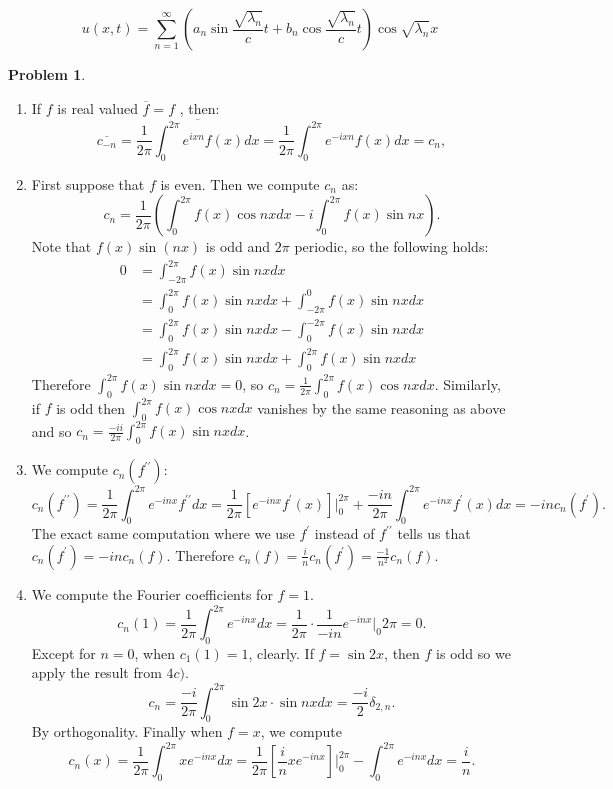\documentclass[12pt, a4paper]{article}
\newtheorem{problem}{Problem}
\theoremstyle{definition}
\newcommand{\penum}{ \begin{enumerate}[label=\bf(\alph*), leftmargin=0pt]}
\newcommand{\epenum}{ \end{enumerate} }
\newcommand{\ol}{\overline}
\begin{document}
$$u(x,t) = \sum_{n=1}^\infty \left( a_n \sin \frac{\sqrt{\lambda_n}}{c}t + b_n \cos \frac{\sqrt{\lambda_n}}{c} t\right)\cos \sqrt{\lambda_n} x$$
 \newpage 
\begin{problem}
\end{problem}
\penum
\item If $f$ is real valued $\ol{f} = f$ , then: 
$$\ol{c_{-n}} = \ol{\frac{1}{2\pi} \int_0^{2\pi} e^{ixn}f(x)dx } = \frac{1}{2\pi} \int_0^{2\pi} e^{-ixn}f(x)dx = c_n,$$
\item 
First suppose that $f$ is even. Then we compute $c_n$ as: 
$$c_n = \frac{1}{2\pi}\left( \int_0^{2\pi} f(x)\cos nx dx - i\int_0^{2\pi} f(x)\sin nx  \right).$$
Note that $f(x)\sin(nx)$ is odd and $2\pi$ periodic, so the following holds: 
\begin{align*} 0& = \int_{-2\pi}^{2\pi}f(x)\sin nx dx
	\\ & = \int_0^{2\pi}f(x)\sin nx dx + \int_{-2\pi }^0 f(x)\sin nx dx 
	\\ & = \int_0^{2\pi}f(x)\sin nx dx - \int_{0}^{-2\pi} f(x)\sin nx dx 
	\\ & = \int_0^{2\pi}f(x)\sin nx dx + \int_{0}^{2\pi} f(x)\sin nx dx \tag{changing variables, f even,}
\end{align*}
Therefore $\int_{0}^{2\pi} f(x)\sin nx dx =0 $, so $c_n =\frac{1}{2\pi }\int_0^{2\pi} f(x)\cos nx dx$. 
Similarly, if $f$ is odd then $\int_0^{2\pi} f(x) \cos nx dx$ vanishes by the same reasoning as above and so $c_n = \frac{-ii}{2\pi} \int_{0}^{2\pi} f(x) \sin nx dx$. 
\item We compute $c_n(f^{\prime \prime})$: 
$$c_n(f^{\prime \prime}) = \frac{1}{2\pi} \int_0^{2\pi} e^{-inx}f^{\prime \prime} dx  = \frac{1}{2\pi} \left[e^{-inx}f^\prime(x) \right] \Big|_{0}^{2\pi}  + \frac{-in}{2\pi} \int_0^{2\pi} e^{-inx}f^\prime(x)dx = -inc_n(f^\prime).$$
The exact same computation where we use $f^\prime$ instead of $f^{\prime \prime}$ tells us that 
$c_n(f^\prime) = -in c_n(f)$. Therefore $c_n(f) = \frac{i}{n}c_n(f^\prime) = \frac{-1}{n^2}c_n(f)$. 
\item We compute the Fourier coefficients for $f=1$.
$$c_n(1) = \frac{1}{2\pi} \int_{0}^{2\pi} e^{-inx}dx = \frac{1}{2\pi}\cdot \frac{1}{-in} e^{-inx}\Big|_{0}2\pi = 0.$$
Except for $n=0$, when $c_1(1)=1$, clearly. If $f = \sin 2x$, then $f$ is odd so we apply the result from $4c)$. 
$$c_n = \frac{-i}{2\pi }\int_{0}^{2\pi}  \sin2x \cdot \sin{nx} dx = \frac{-i}{2} \delta_{2,n}.$$
By orthogonality. 
Finally when $f = x$, we compute 
$$c_n(x) = \frac{1}{2\pi }\int_0^{2\pi} x e^{-inx}dx= \frac{1}{2\pi} \left[\frac{i}{n} xe^{-inx} \right] \Big|_0^{2\pi} - \int_0^{2\pi} e^{-inx}dx = \frac{i}{n}. $$
\epenum
\end{document}
